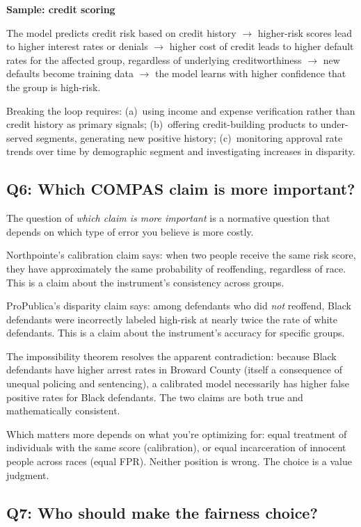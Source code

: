 \textbf{Sample: credit scoring}

The model predicts credit risk based on credit history $\rightarrow$ higher-risk scores lead to higher interest rates or denials $\rightarrow$ higher cost of credit leads to higher default rates for the affected group, regardless of underlying creditworthiness $\rightarrow$ new defaults become training data $\rightarrow$ the model learns with higher confidence that the group is high-risk.

Breaking the loop requires: (a)~using income and expense verification rather than credit history as primary signals; (b)~offering credit-building products to under-served segments, generating new positive history; (c)~monitoring approval rate trends over time by demographic segment and investigating increases in disparity.

\subsection*{Q6: Which COMPAS claim is more important?}

The question of \textit{which claim is more important} is a normative question that depends on which type of error you believe is more costly.

Northpointe's calibration claim says: when two people receive the same risk score, they have approximately the same probability of reoffending, regardless of race. This is a claim about the instrument's consistency across groups.

ProPublica's disparity claim says: among defendants who did \textit{not} reoffend, Black defendants were incorrectly labeled high-risk at nearly twice the rate of white defendants. This is a claim about the instrument's accuracy for specific groups.

The impossibility theorem resolves the apparent contradiction: because Black defendants have higher arrest rates in Broward County (itself a consequence of unequal policing and sentencing), a calibrated model necessarily has higher false positive rates for Black defendants. The two claims are both true and mathematically consistent.

Which matters more depends on what you're optimizing for: equal treatment of individuals with the same score (calibration), or equal incarceration of innocent people across races (equal FPR). Neither position is wrong. The choice is a value judgment.

\subsection*{Q7: Who should make the fairness choice?}


